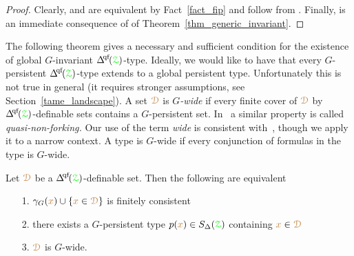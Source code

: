 \begin{proof}
  Clearly,  and  are equivalent by Fact~\ref{fact_fip} and follow from .
  Finally,  is an immediate consequence of  of Theorem~\ref{thm_generic_invariant}.
\end{proof}

The following theorem gives a necessary and sufficient condition for the  existence of global $G$-invariant $\qfDelta({\grZ})$-type.
Ideally, we would like to have that every $G$-persistent $\qfDelta({\grZ})$-type extends to a global persistent type.
Unfortunately this is not true in general (it requires stronger assumptions, see Section~\ref{tame_landscape}).
A set ${\color{brown}\EuScript D}$ is \emph{$G$-wide\/} if every finite cover of ${\color{brown}\EuScript D}$ by $\qfDelta({\grZ})$-definable sets contains a $G$-persistent set.
In~\cite{CK} a similar property is called \textit{quasi-non-forking.}
Our use of the term \textit{wide\/} is consistent with~\cite{Hr}, though we apply it to a narrow context.
A type is $G$-wide if every conjunction of formulas in the type is $G$-wide.

\begin{theorem}\label{thm_generic_invariant2}
  Let ${\color{brown}\EuScript D}$ be a $\qfDelta(\grZ)$-definable set.
  Then the following are equivalent 
  \begin{itemize}
    \item[1.] $\gamma_G({\color{brown} x})\cup\{{\color{brown} x}\in{\color{brown}\EuScript D}\}$ is finitely consistent
    \item[2.] there exists a $G$-persistent type $p({\color{brown} x})\in S_\Delta({\color{green}\EuScript Z})$ containing ${\color{brown} x}\in{\color{brown}\EuScript D}$
    \item[3.] ${\color{brown}\EuScript D}$ is $G$-wide.
  \end{itemize}
\end{theorem}

